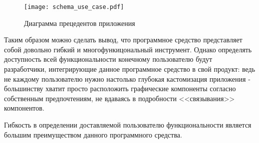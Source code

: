 \begin{figure}
\centering
    \texttt{[image: schema\_use\_case.pdf]}
    \caption{Диаграмма прецедентов приложения}
    \label{sec:design:use_case}
\end{figure}

Таким образом можно сделать вывод, что программное средство представляет собой довольно гибкий и многофункицональный инструмент. Однако определять доступность всей функциональности конечному пользователю будут разработчики, интегрирующие данное программное средство в свой продукт: ведь не каждому пользователю нужно настолько глубокая кастомизация приложения - большинству хватит просто расположить графические компоненты согласно собственным предпочтениям, не вдаваясь в подробности <<связывания>> компонентов.

Гибкость в определении доставляемой пользователю функциональности является большим преимуществом данного программного средства.

